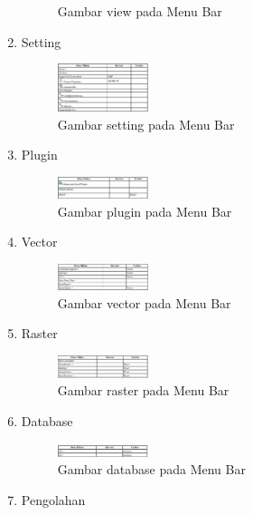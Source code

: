 \begin{enumerate}
\begin{figure}[ht]
    \caption{Gambar view pada Menu Bar}
    \label{menubar2}
    \end{figure}
\item
Setting
\begin{figure}[ht]
    \centerline{\includegraphics[width=0.25\textwidth]{figures/menubar3.png}}
    \caption{Gambar setting pada Menu Bar}
    \label{menubar3}
    \end{figure}
\item
Plugin
\begin{figure}[ht]
    \centerline{\includegraphics[width=0.25\textwidth]{figures/menubar4.png}}
    \caption{Gambar plugin pada Menu Bar}
    \label{menubar4}
    \end{figure}
\item
Vector
\begin{figure}[ht]
    \centerline{\includegraphics[width=0.25\textwidth]{figures/menubar5.png}}
    \caption{Gambar vector pada Menu Bar}
    \label{menubar5}
    \end{figure}
\item
Raster
\begin{figure}[ht]
    \centerline{\includegraphics[width=0.25\textwidth]{figures/menubar6.png}}
    \caption{Gambar raster pada Menu Bar}
    \label{menubar6}
    \end{figure}
\item
Database
\begin{figure}[ht]
    \centerline{\includegraphics[width=0.25\textwidth]{figures/menubar7.png}}
    \caption{Gambar database pada Menu Bar}
    \label{menubar7}
    \end{figure}
\item
Pengolahan
\begin{figure}[ht]

\end{figure}
\end{enumerate}
